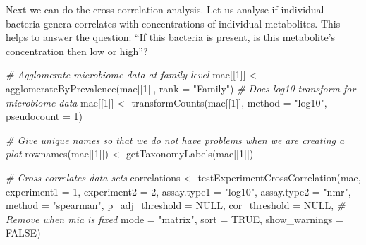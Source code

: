 \documentclass[
]{book}
\newenvironment{Shaded}{\begin{snugshade}}{\end{snugshade}}
\newcommand{\AttributeTok}[1]{\textcolor[rgb]{0.77,0.63,0.00}{#1}}
\newcommand{\CommentTok}[1]{\textcolor[rgb]{0.56,0.35,0.01}{\textit{#1}}}
\newcommand{\ConstantTok}[1]{\textcolor[rgb]{0.00,0.00,0.00}{#1}}
\newcommand{\DecValTok}[1]{\textcolor[rgb]{0.00,0.00,0.81}{#1}}
\newcommand{\FunctionTok}[1]{\textcolor[rgb]{0.00,0.00,0.00}{#1}}
\newcommand{\NormalTok}[1]{#1}
\newcommand{\OtherTok}[1]{\textcolor[rgb]{0.56,0.35,0.01}{#1}}
\newcommand{\StringTok}[1]{\textcolor[rgb]{0.31,0.60,0.02}{#1}}
\begin{document}
Next we can do the cross-correlation analysis. Let us analyse if
individual bacteria genera correlates with concentrations of
individual metabolites. This helps to answer the question: ``If this
bacteria is present, is this metabolite's concentration then low or
high''?

\begin{Shaded}
\begin{Highlighting}[]
\CommentTok{\# Agglomerate microbiome data at family level}
\NormalTok{mae[[}\DecValTok{1}\NormalTok{]] }\OtherTok{\textless{}{-}} \FunctionTok{agglomerateByPrevalence}\NormalTok{(mae[[}\DecValTok{1}\NormalTok{]], }\AttributeTok{rank =} \StringTok{"Family"}\NormalTok{)}
\CommentTok{\# Does log10 transform for microbiome data}
\NormalTok{mae[[}\DecValTok{1}\NormalTok{]] }\OtherTok{\textless{}{-}} \FunctionTok{transformCounts}\NormalTok{(mae[[}\DecValTok{1}\NormalTok{]], }\AttributeTok{method =} \StringTok{"log10"}\NormalTok{, }\AttributeTok{pseudocount =} \DecValTok{1}\NormalTok{)}

\CommentTok{\# Give unique names so that we do not have problems when we are creating a plot}
\FunctionTok{rownames}\NormalTok{(mae[[}\DecValTok{1}\NormalTok{]]) }\OtherTok{\textless{}{-}} \FunctionTok{getTaxonomyLabels}\NormalTok{(mae[[}\DecValTok{1}\NormalTok{]])}

\CommentTok{\# Cross correlates data sets}
\NormalTok{correlations }\OtherTok{\textless{}{-}} \FunctionTok{testExperimentCrossCorrelation}\NormalTok{(mae, }
                                               \AttributeTok{experiment1 =} \DecValTok{1}\NormalTok{,}
                                               \AttributeTok{experiment2 =} \DecValTok{2}\NormalTok{,}
                                               \AttributeTok{assay.type1 =} \StringTok{"log10"}\NormalTok{, }
                                               \AttributeTok{assay.type2 =} \StringTok{"nmr"}\NormalTok{,}
                                               \AttributeTok{method =} \StringTok{"spearman"}\NormalTok{, }
                                               \AttributeTok{p\_adj\_threshold =} \ConstantTok{NULL}\NormalTok{,}
                                               \AttributeTok{cor\_threshold =} \ConstantTok{NULL}\NormalTok{,}
                                               \CommentTok{\# Remove when mia is fixed}
                                               \AttributeTok{mode =} \StringTok{"matrix"}\NormalTok{,}
                                               \AttributeTok{sort =} \ConstantTok{TRUE}\NormalTok{,}
                                               \AttributeTok{show\_warnings =} \ConstantTok{FALSE}\NormalTok{)}
\end{Highlighting}
\end{Shaded}
\end{document}
